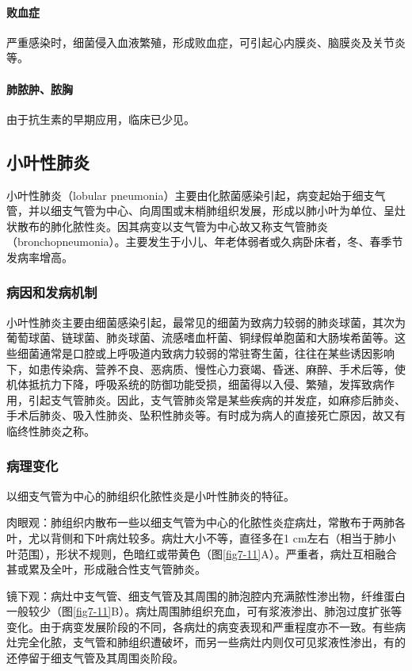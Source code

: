 \paragraph{败血症}
严重感染时，细菌侵入血液繁殖，形成败血症，可引起心内膜炎、脑膜炎及关节炎等。

\paragraph{肺脓肿、脓胸}
由于抗生素的早期应用，临床已少见。

\subsection{小叶性肺炎}

小叶性肺炎（lobular
pneumonia）主要由化脓菌感染引起，病变起始于细支气管，并以细支气管为中心、向周围或末梢肺组织发展，形成以肺小叶为单位、呈灶状散布的肺化脓性炎。因其病变以支气管为中心故又称支气管肺炎（bronchopneumonia）。主要发生于小儿、年老体弱者或久病卧床者，冬、春季节发病率增高。

\subsubsection{病因和发病机制}

小叶性肺炎主要由细菌感染引起，最常见的细菌为致病力较弱的肺炎球菌，其次为葡萄球菌、链球菌、肺炎球菌、流感嗜血杆菌、铜绿假单胞菌和大肠埃希菌等。这些细菌通常是口腔或上呼吸道内致病力较弱的常驻寄生菌，往往在某些诱因影响下，如患传染病、营养不良、恶病质、慢性心力衰竭、昏迷、麻醉、手术后等，使机体抵抗力下降，呼吸系统的防御功能受损，细菌得以入侵、繁殖，发挥致病作用，引起支气管肺炎。因此，支气管肺炎常是某些疾病的并发症，如麻疹后肺炎、手术后肺炎、吸入性肺炎、坠积性肺炎等。有时成为病人的直接死亡原因，故又有临终性肺炎之称。

\subsubsection{病理变化}

以细支气管为中心的肺组织化脓性炎是小叶性肺炎的特征。

肉眼观：肺组织内散布一些以细支气管为中心的化脓性炎症病灶，常散布于两肺各叶，尤以背侧和下叶病灶较多。病灶大小不等，直径多在1
cm左右（相当于肺小叶范围），形状不规则，色暗红或带黄色（图\ref{fig7-11}A）。严重者，病灶互相融合甚或累及全叶，形成融合性支气管肺炎。

镜下观：病灶中支气管、细支气管及其周围的肺泡腔内充满脓性渗出物，纤维蛋白一般较少（图\ref{fig7-11}B）。病灶周围肺组织充血，可有浆液渗出、肺泡过度扩张等变化。由于病变发展阶段的不同，各病灶的病变表现和严重程度亦不一致。有些病灶完全化脓，支气管和肺组织遭破坏，而另一些病灶内则仅可见浆液性渗出，有的还停留于细支气管及其周围炎阶段。

